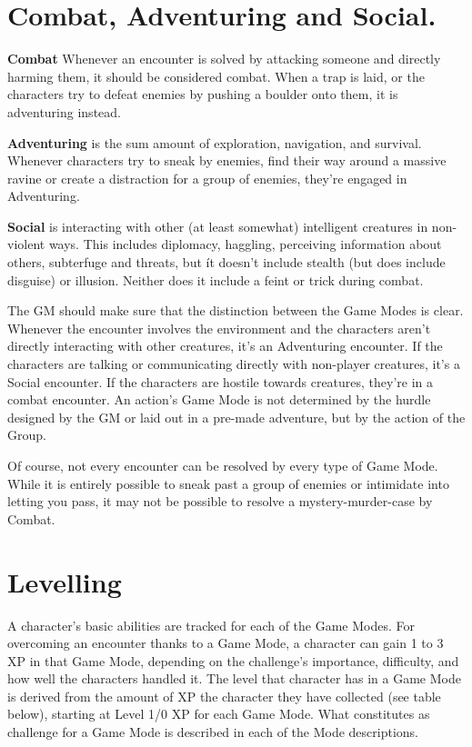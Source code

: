 \section{Combat, Adventuring and Social.}

\textbf{Combat} Whenever an encounter is solved by attacking someone and directly harming them, it should be considered combat. When a trap is laid, or the characters try to defeat enemies by pushing a boulder onto them, it is adventuring instead.

\textbf{Adventuring} is the sum amount of exploration, navigation, and survival. Whenever characters try to sneak by enemies, find their way around a massive ravine or create a distraction for a group of enemies, they're engaged in Adventuring.

\textbf{Social} is interacting with other (at least somewhat) intelligent creatures in non-violent ways. This includes diplomacy, haggling, perceiving information about others, subterfuge and threats, but ít doesn't include stealth (but does include disguise) or illusion. Neither does it include a feint or trick during combat.

The GM should make sure that the distinction between the Game Modes is clear. Whenever the encounter involves the environment and the characters aren't directly interacting with other creatures, it's an Adventuring encounter. If the characters are talking or communicating directly with non-player creatures, it's a Social encounter. If the characters are hostile towards creatures, they're in a combat encounter. An action's Game Mode is not determined by the hurdle designed by the GM or laid out in a pre-made adventure, but by the action of the Group.

Of course, not every encounter can be resolved by every type of Game Mode. While it is entirely possible to sneak past a group of enemies or intimidate into letting you pass, it may not be possible to resolve a mystery-murder-case by Combat.

\section{Levelling}
A character’s basic abilities are tracked for each of the Game Modes. For overcoming an encounter thanks to a Game Mode, a character can gain 1 to 3 XP in that Game Mode, depending on the challenge’s importance, difficulty, and how well the characters handled it. The level that character has in a Game Mode is derived from the amount of XP the character they have collected (see table below), starting at Level 1/0 XP for each Game Mode. What constitutes as challenge for a Game Mode is described in each of the Mode descriptions.

